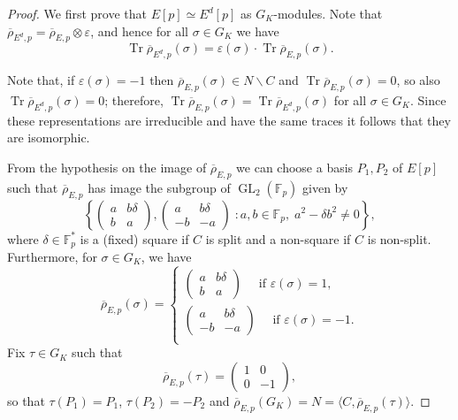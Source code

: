 \documentclass[12pt]{amsart}
\newcommand{\F}{\mathbb{F}}
\newcommand{\rhobar}{{\overline{\rho}}}
\newcommand{\eps}{\varepsilon}
\DeclareMathOperator{\Tr}{Tr}
\newcommand{\GL}{\operatorname{GL}}
\numberwithin{equation}{section}
\theoremstyle{definition}
\theoremstyle{remark}
\begin{document}
\begin{proof} We first prove that $E[p] \simeq E^d[p]$ as $G_K$-modules. 
Note that $\rhobar_{{E^d}, p} = \rhobar_{E, p} \otimes \eps$, and
hence for all $\sigma \in G_K$ we have
\[\Tr \rhobar_{{E^d},p}(\sigma) = \eps(\sigma) \cdot \Tr \rhobar_{E,p}(\sigma).\]

Note that, if $\eps(\sigma) = -1$ then $\rhobar_{E,p}(\sigma) \in N\backslash C$ and $\Tr \rhobar_{E,p}(\sigma) = 0$, so also $\Tr \rhobar_{E^d,p}(\sigma) = 0$;
therefore, $\Tr \rhobar_{E,p}(\sigma) = \Tr \rhobar_{E^d,p}(\sigma)$ 
for all $\sigma \in G_K$. Since these representations are irreducible and have
the same traces it follows that they are isomorphic.

From the hypothesis on the image of $\rhobar_{E,p}$ we can 
choose a basis $P_1, P_2$ of $E[p]$ such that $\rhobar_{E,p}$ has image 
the subgroup of $\GL_2(\F_p)$ given by 
\[
\left\{ 
\begin{pmatrix}
a & b\delta \\
b & a
\end{pmatrix}, 
\begin{pmatrix}
a & b\delta \\
-b & -a
\end{pmatrix}  \; : a, b \in \F_p, \; a^2 - \delta b^2 \neq 0 \right\},
\]
where $\delta \in \F_p^*$ is a (fixed) square if $C$ is split and a
non-square if $C$ is non-split. Furthermore, for $\sigma \in G_K$, we
have
\[
 \rhobar_{E,p}(\sigma) = \begin{cases} 
                            \begin{pmatrix}
                            a & b\delta \\
                            b & a
                            \end{pmatrix} \quad \text{ if } \eps(\sigma) = 1,  \\
\begin{pmatrix}
a & b\delta \\
-b & -a
\end{pmatrix} \quad \text{ if } \eps(\sigma) = -1.  \\
\end{cases}\]
Fix $\tau \in G_K$ such that 
\[
 \rhobar_{E,p}(\tau) =  \begin{pmatrix}
                            1 & 0 \\
                            0 & -1
                            \end{pmatrix},
\]
so that  $\tau(P_1) = P_1$, $\tau(P_2) = -P_2$ and 
$\rhobar_{E,p}(G_K) = N = \langle C,\rhobar_{E,p}(\tau) \rangle$.


\end{proof}
\end{document}
